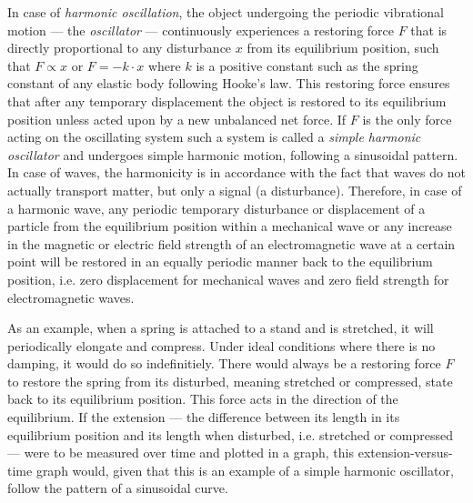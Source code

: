 In case of \emph{harmonic oscillation}, the object undergoing the periodic vibrational motion --- the \emph{oscillator} --- continuously experiences a restoring force $F$ that is directly proportional to any disturbance $x$ from its equilibrium position, such that $F \propto x$ or $F = -k \cdot x$ where $k$ is a positive constant such as the spring constant of any elastic body following Hooke's law. This restoring force ensures that after any temporary displacement the object is restored to its equilibrium position unless acted upon by a new unbalanced net force. If $F$ is the only force acting on the oscillating system such a system is called a \emph{simple harmonic oscillator} and undergoes simple harmonic motion, following a sinusoidal pattern. In case of waves, the harmonicity is in accordance with the fact that waves do not actually transport matter, but only a signal (a disturbance). Therefore, in case of a harmonic wave, any periodic temporary disturbance or displacement of a particle from the equilibrium position within a mechanical wave or any increase in the magnetic or electric field strength of an electromagnetic wave at a certain point will be restored in an equally periodic manner back to the equilibrium position, i.e. zero displacement for mechanical waves and zero field strength for electromagnetic waves.

As an example, when a spring is attached to a stand and is stretched, it will periodically elongate and compress. Under ideal conditions where there is no damping, it would do so indefinitiely. There would always be a restoring force $F$ to restore the spring from its disturbed, meaning stretched or compressed, state back to its equilibrium position. This force acts in the direction of the equilibrium. If the extension --- the difference between its length in its equilibrium position and its length when disturbed, i.e. stretched or compressed --- were to be measured over time and plotted in a graph, this extension-versus-time graph would, given that this is an example of a simple harmonic oscillator, follow the pattern of a sinusoidal curve.

